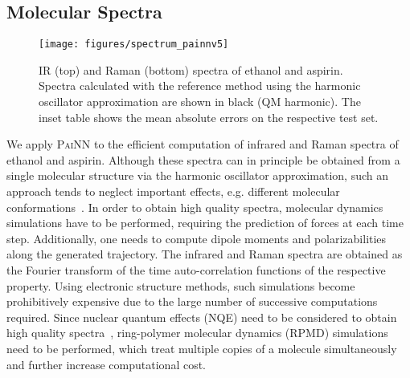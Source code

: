 \documentclass[reprint,
amsmath,amssymb,
 aip,jcp
]{revtex4-2}
\newcommand{\painn}{\textsc{PaiNN}}
\newcommand{\new}[1]{#1}
\begin{document}
\subsection{Molecular Spectra}

\begin{figure*}[tb]
    \centering
    \texttt{[image: figures/spectrum\_painnv5]}
    \caption{IR (top) and Raman (bottom) spectra of ethanol and aspirin. \new{Spectra calculated with the reference method using the harmonic oscillator approximation are shown in black (QM harmonic).} The inset table shows the mean absolute errors on the respective test set.}
    \label{fig:spectra_aspirin}
\end{figure*}

We apply \painn{} to the efficient computation of infrared and Raman spectra of ethanol and aspirin.
\new{Although these spectra can in principle be obtained from a single molecular structure via the harmonic oscillator approximation, such an approach tends to neglect important effects, e.g. different molecular conformations~\cite{thomas2013computing}.
In order to obtain high quality spectra,}
molecular dynamics simulations have to be performed, requiring the prediction of forces at each time step.
Additionally, one needs to compute dipole moments and polarizabilities along the generated trajectory.
The infrared and Raman spectra are obtained as the Fourier transform of the time auto-correlation functions of the respective property.
Using electronic structure methods, such simulations become prohibitively expensive due to the large number of successive computations required.
Since nuclear quantum effects (NQE) need to be considered to obtain high quality spectra~\cite{sauceda2021dynamical}, ring-polymer molecular dynamics (RPMD) simulations need to be performed, which treat multiple copies of a molecule simultaneously and further increase computational cost.
 
\end{document}
